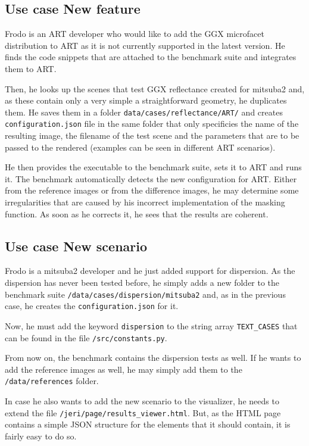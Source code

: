 \subsection{Use case New feature}
\label{sec:frodo}
Frodo is an ART developer who would like to add the GGX microfacet distribution to ART as it is not currently supported in the latest version. He finds the code snippets that are attached to the benchmark suite and integrates them to ART.

Then, he looks up the scenes that test GGX reflectance created for mitsuba2 and, as these contain only a very simple a straightforward geometry, he duplicates them. He saves them in a folder \texttt{data/cases/reflectance/ART/} and creates \texttt{configuration.json} file in the same folder that only specificies the name of the resulting image, the filename of the test scene and the parameters that are to be passed to the rendered (examples can be seen in different ART scenarios).

He then provides the executable to the benchmark suite, sets it to ART and runs it. The benchmark automatically detects the new configuration for ART. Either from the reference images or from the difference images, he may determine some irregularities that are caused by his incorrect implementation of the masking function. As soon as he corrects it, he sees that the results are coherent.

\subsection{Use case New scenario}

Frodo is a mitsuba2 developer and he just added support for dispersion. As the dispersion has never been tested before, he simply adds a new folder to the benchmark suite \texttt{/data/cases/dispersion/mitsuba2} and, as in the previous case, he creates the \texttt{configuration.json} for it.

Now, he must add the keyword \texttt{dispersion} to the string array \texttt{TEXT\_CASES} that can be found in the file \texttt{/src/constants.py}.

From now on, the benchmark contains the dispersion tests as well. If he wants to add the reference images as well, he may simply add them to the \texttt{/data/references} folder.

In case he also wants to add the new scenario to the visualizer, he needs to extend the file \texttt{/jeri/page/results\_viewer.html}. But, as the HTML page contains a simple JSON structure for the elements that it should contain, it is fairly easy to do so.

